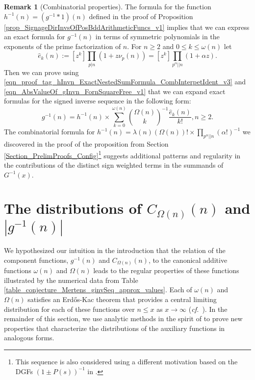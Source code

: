 \documentclass[11pt,reqno,a4letter]{article}
\numberwithin{figure}{section}
\numberwithin{table}{section}
\newcommand{\cf}{\textit{cf.\ }}
\theoremstyle{plain}
\numberwithin{theorem}{section}
\theoremstyle{definition}
\newtheorem{remark}[theorem]{Remark}
\begin{document}
\begin{remark}[Combinatorial properties]
The formula for the function $h^{-1}(n) = (g^{-1} \ast 1)(n)$ defined in the proof of 
Proposition \ref{prop_SignageDirInvsOfPosBddArithmeticFuncs_v1} implies that we can express 
an exact formula for $g^{-1}(n)$ in terms of symmetric polynomials in the 
exponents of the prime factorization of $n$. 
For $n \geq 2$ and $0 \leq k \leq \omega(n)$ let 
\[
\widehat{e}_k(n) := [z^k] \prod_{p|n} (1 + z \nu_p(n)) = [z^k] \prod_{p^{\alpha} || n} (1 + \alpha z). 
\]
Then we can prove using 
\eqref{eqn_proof_tag_hInvn_ExactNestedSumFormula_CombInterpetIdent_v3} and 
\eqref{eqn_AbsValueOf_gInvn_FornSquareFree_v1} that we can expand exact formulas for 
the signed inverse sequence in the following form: 
\[
g^{-1}(n) = h^{-1}(n) \times \sum_{k=0}^{\omega(n)} \binom{\Omega(n)}{k}^{-1} 
     \frac{\widehat{e}_k(n)}{k!}, n \geq 2. 
\]
The combinatorial formula for 
$h^{-1}(n) = \lambda(n) (\Omega(n))! \times \prod_{p^{\alpha} || n} (\alpha !)^{-1}$ 
we discovered in the proof of the proposition from 
Section \ref{Section_PrelimProofs_Config}\footnote{ 
     This sequence is also considered using a different motivation based on the DGFs 
     $(1\pm P(s))^{-1}$ in \cite[\S 2]{FROBERG-1968}. 
}  
suggests additional patterns and regularity in the contributions of the distinct sign weighted 
terms in the summands of $G^{-1}(x)$. 
\end{remark}

\newpage
\section{The distributions of $C_{\Omega(n)}(n)$ and $|g^{-1}(n)|$} 
\label{Section_NewFormulasForgInvn} 

We hypothesized our intuition in the introduction that the relation of the component 
functions, $g^{-1}(n)$ and $C_{\Omega(n)}(n)$, to the canonical additive functions 
$\omega(n)$ and $\Omega(n)$ leads to the regular properties of these functions 
illustrated by the numerical data from 
Table \ref{table_conjecture_Mertens_ginvSeq_approx_values}. 
Each of $\omega(n)$ and $\Omega(n)$ satisfies 
an Erd\H{o}s-Kac theorem that provides a central limiting 
distribution for each of these functions over 
$n \leq x$ as $x \rightarrow \infty$ 
\cite{ERDOS-KAC-REF,BILLINGSLY-CLT-PRIMEDIVFUNC,RENYI-TURAN} 
(\cf \cite{CLT-RANDOM-ORDERED-FACTS-2011}). 
In the remainder of this section, we use analytic methods in the spirit of 
\cite[\S 7.4]{MV} to prove new properties that characterize the distributions of the 
auxiliary functions in analogous forms. 
\end{document}
